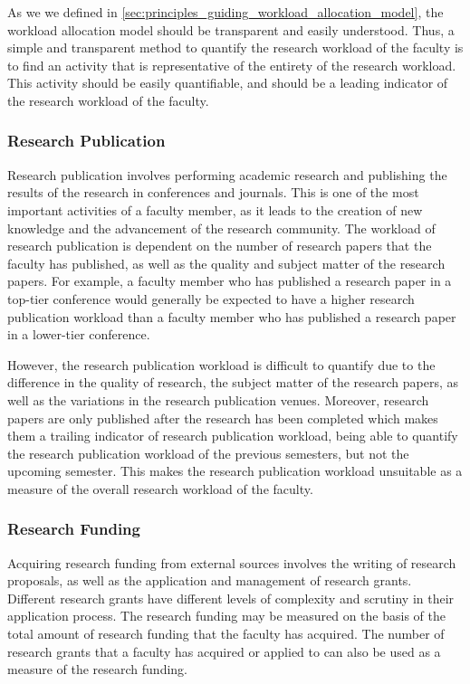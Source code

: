 As we we defined in \autoref{sec:principles_guiding_workload_allocation_model}, the workload allocation model should be transparent and easily understood. Thus, a simple and transparent method to quantify the research workload of the faculty is to find an activity that is representative of the entirety of the research workload. This activity should be easily quantifiable, and should be a leading indicator of the research workload of the faculty.


\subsubsection{Research Publication}

Research publication involves performing academic research and publishing the results of the research in conferences and journals. This is one of the most important activities of a faculty member, as it leads to the creation of new knowledge and the advancement of the research community. The workload of research publication is dependent on the number of research papers that the faculty has published, as well as the quality and subject matter of the research papers. For example, a faculty member who has published a research paper in a top-tier conference would generally be expected to have a higher research publication workload than a faculty member who has published a research paper in a lower-tier conference.

However, the research publication workload is difficult to quantify due to the difference in the quality of research, the subject matter of the research papers, as well as the variations in the research publication venues. Moreover, research papers are only published after the research has been completed which makes them a trailing indicator of research publication workload, being able to quantify the research publication workload of the previous semesters, but not the upcoming semester. This makes the research publication workload unsuitable as a measure of the overall research workload of the faculty.

\subsubsection{Research Funding}

Acquiring research funding from external sources involves the writing of research proposals, as well as the application and management of research grants. Different research grants have different levels of complexity and scrutiny in their application process. The research funding may be measured on the basis of the total amount of research funding that the faculty has acquired. The number of research grants that a faculty has acquired or applied to can also be used as a measure of the research funding.


